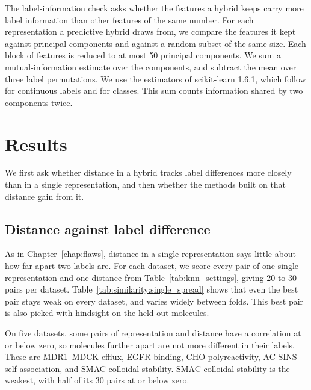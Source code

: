 The label-information check asks whether the features a hybrid keeps carry more label information than other features of the same number. For each representation a predictive hybrid draws from, we compare the features it kept against principal components and against a random subset of the same size. Each block of features is reduced to at most 50 principal components. We sum a mutual-information estimate over the components, and subtract the mean over three label permutations. We use the estimators of scikit-learn 1.6.1, which follow \citet{Kraskov2004} for continuous labels and \citet{Ross2014} for classes. This sum counts information shared by two components twice.

\section{Results}
We first ask whether distance in a hybrid tracks label differences more closely than in a single representation, and then whether the methods built on that distance gain from it.

\subsection{Distance against label difference}\label{sec:similarity:results_similarity}

As in Chapter~\ref{chap:flaws}, distance in a single representation says little about how far apart two labels are. For each dataset, we score every pair of one single representation and one distance from Table~\ref{tab:knn_settings}, giving 20 to 30 pairs per dataset. Table~\ref{tab:similarity:single_spread} shows that even the best pair stays weak on every dataset, and varies widely between folds. This best pair is also picked with hindsight on the held-out molecules.

On five datasets, some pairs of representation and distance have a correlation at or below zero, so molecules further apart are not more different in their labels. These are MDR1--MDCK efflux, EGFR binding, CHO polyreactivity, AC-SINS self-association, and SMAC colloidal stability. SMAC colloidal stability is the weakest, with half of its 30 pairs at or below zero.

